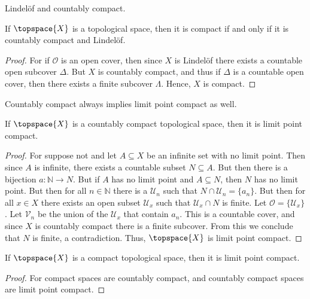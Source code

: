 \documentclass{book}                                                           %
\begin{document}
            Lindel\"{o}f and countably compact.
            \begin{theorem}
                If $\topspace{X}$ is a topological space, then it is compact if and
                only if it is countably compact and Lindel\"{o}f.
            \end{theorem}
            \begin{proof}
                For if $\mathcal{O}$ is an open cover, then since $X$ is
                Lindel\"{o}f there exists a countable open subcover $\Delta$. But
                $X$ is countably compact, and thus if $\Delta$ is a countable open
                cover, then there exists a finite subcover $\Lambda$. Hence, $X$
                is compact.
            \end{proof}
            Countably compact always implies limit point compact as well.
            \begin{theorem}
                If $\topspace{X}$ is a countably compact topological space, then it
                is limit point compact.
            \end{theorem}
            \begin{proof}
                For suppose not and let $A\subseteq{X}$ be an infinite set with no
                limit point. Then since $A$ is infinite, there exists a countable
                subset $N\subseteq{A}$. But then there is a bijection
                $a:\mathbb{N}\rightarrow{N}$. But if $A$ has no limit point and
                $A\subseteq{N}$, then $N$ has no limit point. But then for all
                $n\in\mathbb{N}$ there is a $\mathcal{U}_{n}$ such that
                $N\cap\mathcal{U}_{n}=\{a_{n}\}$. But then for all $x\in{X}$ there
                exists an open subset $\mathcal{U}_{x}$ such that
                $\mathcal{U}_{x}\cap{N}$ is finite. Let
                $\mathcal{O}=\{\mathcal{U}_{x}\}$. Let $\mathcal{V}_{n}$ be the
                union of the $\mathcal{U}_{x}$ that contain $a_{n}$. This is a
                countable cover, and since $X$ is countably compact there is a
                finite subcover. From this we conclude that $N$ is finite, a
                contradiction. Thus, $\topspace{X}$ is limit point compact.
            \end{proof}
            \begin{theorem}
                If $\topspace{X}$ is a compact topological space, then it is limit
                point compact.
            \end{theorem}
            \begin{proof}
                For compact spaces are countably compact, and countably compact
                spaces are limit point compact.
            \end{proof}
\end{document}
